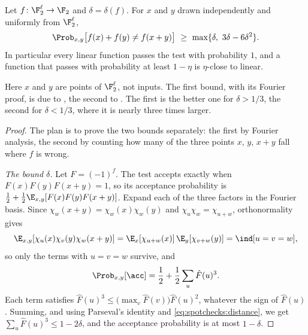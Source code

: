 \begin{refsection}
\begin{theorem}\label{thm:spotchecks:blr}
Let $f\colon\F_2^\ell\to\F_2$ and $\delta=\delta(f)$. For $x$ and $y$ drawn independently and uniformly from $\F_2^\ell$,
\[
  \Prob_{x,y}\bigl[f(x)+f(y)\ne f(x+y)\bigr]\ \ge\ \max\{\delta,\ 3\delta-6\delta^2\}.
\]
In particular every linear function passes the test with probability $1$, and a function that passes with probability at least $1-\eta$ is $\eta$-close to linear.
\end{theorem}

Here $x$ and $y$ are points of $\F_2^\ell$, not inputs. The first bound, with its Fourier proof, is due to \textcite{BellareEtAl1996}, the second to \textcite{BellareEtAl1993}. The first is the better one for $\delta>1/3$, the second for $\delta<1/3$, where it is nearly three times larger.

\begin{proof}
The plan is to prove the two bounds separately: the first by Fourier analysis, the second by counting how many of the three points $x$, $y$, $x+y$ fall where $f$ is wrong.

\emph{The bound $\delta$.} Let $F=(-1)^f$. The test accepts exactly when $F(x)F(y)F(x+y)=1$, so its acceptance probability is $\frac12+\frac12\E_{x,y}[F(x)F(y)F(x+y)]$. Expand each of the three factors in the Fourier basis. Since $\chi_w(x+y)=\chi_w(x)\chi_w(y)$ and $\chi_u\chi_w=\chi_{u+w}$, orthonormality gives
\[
  \E_{x,y}[\chi_u(x)\chi_v(y)\chi_w(x+y)]=\E_x[\chi_{u+w}(x)]\,\E_y[\chi_{v+w}(y)]=\ind[u=v=w],
\]
so only the terms with $u=v=w$ survive, and
\begin{equation}\label{eq:spotchecks:blrfourier}
  \Prob_{x,y}[\acc]=\frac12+\frac12\sum_u\hat F(u)^3.
\end{equation}
Each term satisfies $\hat F(u)^3\le\bigl(\max_v\hat F(v)\bigr)\hat F(u)^2$, whatever the sign of $\hat F(u)$. Summing, and using Parseval's identity and \eqref{eq:spotchecks:distance}, we get $\sum_u\hat F(u)^3\le1-2\delta$, and the acceptance probability is at most $1-\delta$.


\end{proof}
\end{refsection}
